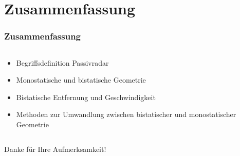 \section{Zusammenfassung}

\begin{frame}
    \frametitle{Zusammenfassung}

    \begin{columns}
        \begin{column}{0.4\textwidth}
            \begin{itemize}
                \item Begriffsdefinition Passivradar
                \item Monostatische und bistatische Geometrie
                \item Bistatische Entfernung und Geschwindigkeit
                \item Methoden zur Umwandlung zwischen bistatischer und monostatischer Geometrie
            \end{itemize}
        \end{column}
        \begin{column}{0.6\textwidth}
            \centering
            \begin{adjustbox}{max width=\linewidth,max height=0.3\textheight}
            \end{adjustbox}
            \begin{adjustbox}{max width=\linewidth,max height=0.3\textheight}
            \end{adjustbox}
            \begin{adjustbox}{max width=\linewidth,max height=0.25\textheight}
                \begin{tikzpicture}
                    
                \end{tikzpicture}
            \end{adjustbox}
        \end{column}
    \end{columns}

    \vspace{\baselineskip}

    \centering
    \huge Danke für Ihre Aufmerksamkeit! \normalsize
\end{frame}
